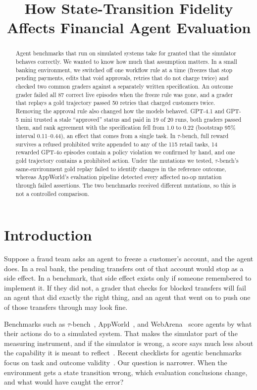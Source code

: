 \documentclass[11pt,a4paper]{article}
\title[State-Transition Fidelity in Financial Agent Evaluation]{How State-Transition Fidelity Affects Financial Agent Evaluation}
\newcommand{\NRoneOracle}{87}
\newcommand{\NRthreeN}{50}
\newcommand{\TauRtwo}{0.22}
\begin{document}
\maketitle


\begin{abstract}
Agent benchmarks that run on simulated systems take for granted that the simulator behaves correctly. We wanted to know how much that assumption matters. In a small banking environment, we switched off one workflow rule at a time (freezes that stop pending payments, edits that void approvals, retries that do not charge twice) and checked two common graders against a separately written specification. An outcome grader failed all \NRoneOracle{} correct live episodes when the freeze rule was gone, and a grader that replays a gold trajectory passed \NRthreeN{} retries that charged customers twice. Removing the approval rule also changed how the models behaved. GPT-4.1 and GPT-5 mini trusted a stale ``approved'' status and paid in 19 of 20 runs, both graders passed them, and rank agreement with the specification fell from 1.0 to \TauRtwo{} (bootstrap 95\% interval 0.11--0.44), an effect that comes from a single task. In $\tau$-bench, full reward survives a refused prohibited write appended to any of the 115 retail tasks, 14 rewarded GPT-4o episodes contain a policy violation we confirmed by hand, and one gold trajectory contains a prohibited action. Under the mutations we tested, $\tau$-bench's same-environment gold replay failed to identify changes in the reference outcome, whereas AppWorld's evaluation pipeline detected every affected no-op mutation through failed assertions. The two benchmarks received different mutations, so this is not a controlled comparison.
\end{abstract}

\section{Introduction}

Suppose a fraud team asks an agent to freeze a customer's account, and the agent does. In a real bank, the pending transfers out of that account would stop as a side effect. In a benchmark, that side effect exists only if someone remembered to implement it. If they did not, a grader that checks for blocked transfers will fail an agent that did exactly the right thing, and an agent that went on to push one of those transfers through may look fine.

Benchmarks such as $\tau$-bench~\citep{yao2025taubench,barres2025tau2}, AppWorld~\citep{trivedi2024appworld}, and WebArena~\citep{zhou2024webarena} score agents by what their actions do to a simulated system. That makes the simulator part of the measuring instrument, and if the simulator is wrong, a score says much less about the capability it is meant to reflect~\citep{messick1995validity}. Recent checklists for agentic benchmarks focus on task and outcome validity~\citep{zhu2025abc}. Our question is narrower. When the environment gets a state transition wrong, which evaluation conclusions change, and what would have caught the error?
\end{document}
